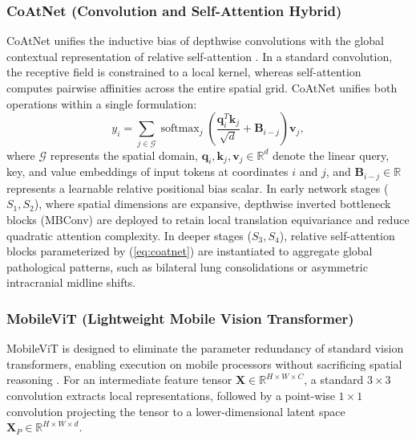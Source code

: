 \documentclass[journal]{IEEEtran}
\begin{document}
\subsubsection{CoAtNet (Convolution and Self-Attention Hybrid)}
CoAtNet unifies the inductive bias of depthwise convolutions with the global contextual representation of relative self-attention \cite{dai2021coatnet}. In a standard convolution, the receptive field is constrained to a local kernel, whereas self-attention computes pairwise affinities across the entire spatial grid. CoAtNet unifies both operations within a single formulation:
\begin{equation}
y_i = \sum_{j \in \mathcal{G}} \operatorname{softmax}_j \left( \frac{\mathbf{q}_i^T \mathbf{k}_j}{\sqrt{d}} + \mathbf{B}_{i-j} \right) \mathbf{v}_j,
\label{eq:coatnet}
\end{equation}
where $\mathcal{G}$ represents the spatial domain, $\mathbf{q}_i, \mathbf{k}_j, \mathbf{v}_j \in \mathbb{R}^d$ denote the linear query, key, and value embeddings of input tokens at coordinates $i$ and $j$, and $\mathbf{B}_{i-j} \in \mathbb{R}$ represents a learnable relative positional bias scalar. In early network stages ($S_1, S_2$), where spatial dimensions are expansive, depthwise inverted bottleneck blocks (MBConv) are deployed to retain local translation equivariance and reduce quadratic attention complexity. In deeper stages ($S_3, S_4$), relative self-attention blocks parameterized by (\ref{eq:coatnet}) are instantiated to aggregate global pathological patterns, such as bilateral lung consolidations or asymmetric intracranial midline shifts.

\subsubsection{MobileViT (Lightweight Mobile Vision Transformer)}
MobileViT is designed to eliminate the parameter redundancy of standard vision transformers, enabling execution on mobile processors without sacrificing spatial reasoning \cite{mehta2021mobilevit}. For an intermediate feature tensor $\mathbf{X} \in \mathbb{R}^{H \times W \times C}$, a standard $3\times3$ convolution extracts local representations, followed by a point-wise $1\times1$ convolution projecting the tensor to a lower-dimensional latent space $\mathbf{X}_P \in \mathbb{R}^{H \times W \times d}$. 
\end{document}
